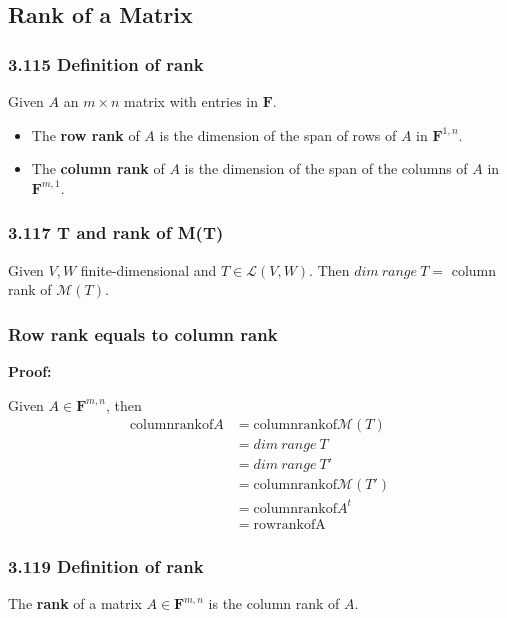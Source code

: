 \documentclass{article}
\begin{document}
\subsection*{Rank of a Matrix}
\subsubsection*{3.115 Definition of rank}
Given $A$ an $m \times n$ matrix with entries in $\mathbf{F}$.
\begin{itemize}
    \item The \textbf{row rank} of $A$ is the dimension of the span of rows of $A$ in $\mathbf{F}^{1, n}$.
    \item The \textbf{column rank} of $A$ is the dimension of the span of the columns of $A$ in $\mathbf{F}^{m,1}$.
\end{itemize}
\subsubsection*{3.117 T and rank of M(T)}
Given $V, W$ finite-dimensional and $T \in \mathcal{L}(V, W)$. Then $dim\ range\ T = $ column rank of $\mathcal{M}(T)$.
\subsubsection*{Row rank equals to column rank}
\textbf{Proof:}
\begin{addmargin}[1em]{0em}
    Given $A \in \mathbf{F}^{m, n}$, then
    \begin{equation*}
        \begin{split}
            \mathrm{column rank of } A &= \mathrm{column rank of } \mathcal{M}(T)\\
            &= dim\ range\ T\\
            &= dim\ range\ T'\\
            &= \mathrm{column rank of } \mathcal{M}(T')\\
            &= \mathrm{column rank of } A^t\\
            &= \mathrm{row rank of A}
        \end{split}
    \end{equation*}
\end{addmargin}
\subsubsection*{3.119 Definition of rank}
The \textbf{rank} of a matrix $A \in \mathbf{F}^{m,n}$ is the column rank of $A$.
\end{document}

